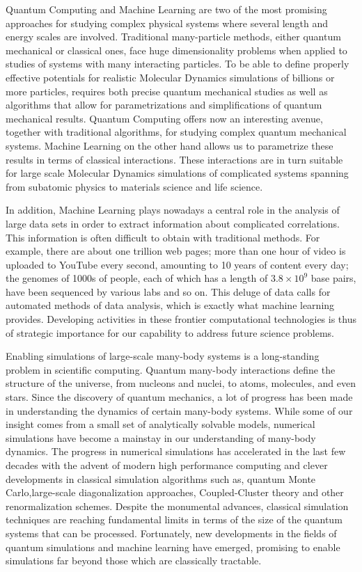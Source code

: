 \documentclass[twoside,english]{uiofysmaster}
\begin{document}
Quantum Computing and Machine Learning are two of the most promising
approaches for studying complex physical systems where several length
and energy scales are involved.  Traditional many-particle methods,
either quantum mechanical or classical ones, face huge dimensionality
problems when applied to studies of systems with many interacting
particles. To be able to define properly effective potentials for
realistic Molecular Dynamics simulations of billions or more particles,
requires both precise quantum mechanical studies as well as algorithms
that allow for parametrizations and simplifications of quantum
mechanical results. Quantum Computing offers now an interesting
avenue, together with traditional algorithms, for studying complex
quantum mechanical systems. Machine Learning on the other hand allows us to parametrize
these results in terms of classical interactions. These interactions
are in turn suitable for large scale Molecular Dynamics simulations of
complicated systems spanning from subatomic physics to materials
science and life science.

In addition, Machine Learning plays nowadays a central role
in the analysis of large data sets in order to extract information
about complicated correlations. This information is often difficult to
obtain with traditional methods. For example, there are about one
trillion web pages; more than one hour of video is uploaded to YouTube
every second, amounting to 10 years of content every day; the genomes
of 1000s of people, each of which has a length of $3.8\times 10^9$
base pairs, have been sequenced by various labs and so on. This deluge
of data calls for automated methods of data analysis, which is exactly
what machine learning provides.  Developing activities in these
frontier computational technologies is thus of strategic importance
for our capability to address future science problems.


Enabling simulations of large-scale many-body systems is a
long-standing problem in scientific computing.  Quantum many-body
interactions define the structure of the universe, from nucleons and
nuclei, to atoms, molecules, and even stars. Since the discovery of
quantum mechanics, a lot of progress has been made in understanding
the dynamics of certain many-body systems. While some of our insight
comes from a small set of analytically solvable models, numerical
simulations have become a mainstay in our understanding of many-body
dynamics. The progress in numerical simulations has accelerated in the
last few decades with the advent of modern high performance computing
 and clever developments in classical simulation algorithms such
as, quantum Monte Carlo,large-scale diagonalization approaches,
Coupled-Cluster theory and other renormalization schemes.  Despite the
monumental advances, classical simulation techniques are reaching
fundamental limits in terms of the size of the quantum systems that
can be processed. Fortunately, new developments in the fields of quantum
simulations and machine learning have emerged, promising to enable simulations far beyond
those which are classically tractable. 
\end{document}
